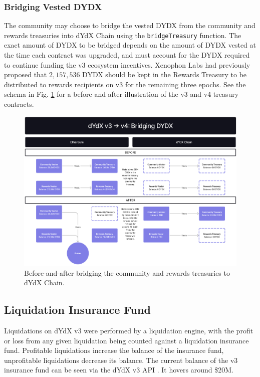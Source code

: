         \subsubsection{Bridging Vested DYDX}

            The community may choose to bridge the vested DYDX from the community and rewards treasuries into dYdX Chain using the \texttt{bridgeTreasury} function. The exact amount of DYDX to be bridged depends on the amount of DYDX vested at the time each contract was upgraded, and must account for the DYDX required to continue funding the v3 ecosystem incentives. Xenophon Labs had previously proposed that $2,157,536$ DYDX should be kept in the Rewards Treasury to be distributed to rewards recipients on v3 for the remaining three epochs. See the schema in Fig. \ref{fig:bridging} for a before-and-after illustration of the v3 and v4 treasury contracts.

            \begin{figure}[htp]
                \centering
                \includegraphics[width=\linewidth]{figs/Bridging.png}
                \caption{Before-and-after bridging the community and rewards treasuries to dYdX Chain.}
                \label{fig:bridging}
            \end{figure}

    \subsection{Liquidation Insurance Fund}

        Liquidations on dYdX v3 were performed by a liquidation engine, with the profit or loss from any given liquidation being counted against a liquidation insurance fund. Profitable liquidations increase the balance of the insurance fund, unprofitable liquidations decrease its balance. The current balance of the v3 insurance fund can be seen via the dYdX v3 API . It hovers around \$20M.

